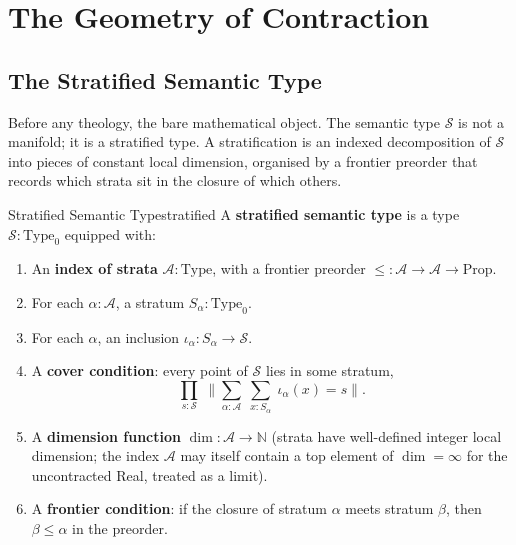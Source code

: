 \documentclass[11pt,a4paper]{article}
\begin{document}
\section{The Geometry of Contraction}
\label{sec:tzimtzum}

\subsection{The Stratified Semantic Type}
\label{subsec:stratified}

Before any theology, the bare mathematical object. The semantic type $\mathcal{S}$ is not a manifold; it is a stratified type. A stratification is an indexed decomposition of $\mathcal{S}$ into pieces of constant local dimension, organised by a frontier preorder that records which strata sit in the closure of which others.

\begin{defbox}{Stratified Semantic Type}{stratified}
A \textbf{stratified semantic type} is a type $\mathcal{S} : \mathrm{Type}_0$ equipped with:
\begin{enumerate}
    \item An \textbf{index of strata} $\mathcal{A} : \mathrm{Type}$, with a frontier preorder ${\leq} : \mathcal{A} \to \mathcal{A} \to \mathrm{Prop}$.
    \item For each $\alpha : \mathcal{A}$, a stratum $S_\alpha : \mathrm{Type}_0$.
    \item For each $\alpha$, an inclusion $\iota_\alpha : S_\alpha \to \mathcal{S}$.
    \item A \textbf{cover condition}: every point of $\mathcal{S}$ lies in some stratum,
    \[
    \prod_{s : \mathcal{S}}\; \Big\| \sum_{\alpha : \mathcal{A}}\; \sum_{x : S_\alpha}\; \iota_\alpha(x) = s \Big\|.
    \]
    \item A \textbf{dimension function} $\dim : \mathcal{A} \to \mathbb{N}$ (strata have well-defined integer local dimension; the index $\mathcal{A}$ may itself contain a top element of $\dim = \infty$ for the uncontracted Real, treated as a limit).
    \item A \textbf{frontier condition}: if the closure of stratum $\alpha$ meets stratum $\beta$, then $\beta \leq \alpha$ in the preorder.
\end{enumerate}
\end{defbox}
\end{document}
